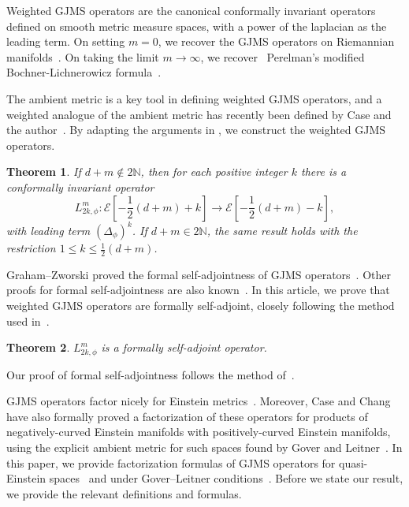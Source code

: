 \documentclass{amsart}
\newtheorem{theorem}{Theorem}[section]
\begin{document}
Weighted GJMS operators are the canonical conformally invariant operators defined on smooth metric measure spaces, with a power of the laplacian as the leading term. On setting $m=0$, we recover the GJMS operators on Riemannian manifolds~\cites{GJMS1992}. On taking the limit $m\to\infty$, we recover~\cite{KHAITAN2026110787} Perelman's modified Bochner-Lichnerowicz formula~\cite{Perelman1}. 

The ambient metric is a key tool in defining weighted GJMS operators, and a weighted analogue of the ambient metric has recently been defined by Case and the author~\cites{CaseKhaitan2022}. By adapting the arguments in \cites{GJMS1992}, we construct the weighted GJMS operators. 

\begin{theorem}
\label{main-theorem}
If $d+m\notin 2\mathbb{N}$, then for each positive integer $k$ there is a conformally invariant operator $$L_{2k,\phi}^m:\mathcal{E}[-\frac{1}{2}(d+m)+k]\to \mathcal{E}[-\frac{1}{2}(d+m)-k],$$ with leading term $(\Delta_\phi)^k$. If $d+m\in 2\mathbb{N}$, the same result holds with the restriction $1\leq k\leq \frac{1}{2}(d+m)$.
\end{theorem}

Graham--Zworski proved the formal self-adjointness of GJMS operators~\cites{GrahamZworski2003}. Other proofs for formal self-adjointness are also known~\cites{FeffermanGraham2002,FeffermanGraham2013,Juhl2013}. In this article, we prove that weighted GJMS operators are formally self-adjoint, closely following the method used in~\cites{FeffermanGraham2002}.
\begin{theorem}
\label{self-adjoint-theorem}
$L_{2k,\phi}^m$ is a formally self-adjoint operator. 
\end{theorem}
Our proof of formal self-adjointness follows the method of~\cites{FeffermanGraham2002}.

GJMS operators factor nicely for Einstein metrics~\cites{Gover2006q,FeffermanGraham2012}. Moreover, Case and Chang~\cites{CaseChang2013} have also formally proved a factorization of these operators for products of negatively-curved Einstein manifolds with positively-curved Einstein manifolds, using the explicit ambient metric for such spaces found by Gover and Leitner~\cites{GoverLeitner2008}. In this paper, we provide factorization formulas of GJMS operators for quasi-Einstein spaces~\cites{Case2014s} and under Gover--Leitner conditions~\cites{GoverLeitner2008}. Before we state our result, we provide the relevant definitions and formulas. 
\end{document}
